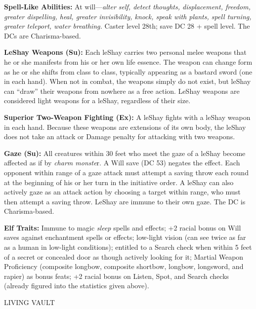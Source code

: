 \documentclass{article}
\begin{document}
{\textbf{Spell-Like Abilities: }At will---\textit{alter self, detect thoughts, displacement, 
freedom, greater dispelling, heal, greater invisibility, knock, speak with plants, 
spell turning, greater teleport, water breathing. }Caster level 28th; save DC 28 
+ spell level. The DCs are Charisma-based.

\textbf{LeShay Weapons (Su):} Each leShay carries two personal melee weapons that 
he or she manifests from his or her own life essence. The weapon can change form 
as he or she shifts from class to class, typically appearing as a bastard sword 
(one in each hand). When not in combat, the weapons simply do not exist, but leShay 
can ``draw'' their weapons from nowhere as a free action. LeShay weapons are considered 
light weapons for a leShay, regardless of their size. 

\textbf{Superior Two-Weapon Fighting (Ex):} A leShay fights with a leShay weapon 
in each hand. Because these weapons are extensions of its own body, the leShay 
does not take an attack or Damage penalty for attacking with two weapons. 

\textbf{Gaze (Su):} All creatures within 30 feet who meet the gaze of a leShay 
become affected as if by \textit{charm monste}r. A Will save (DC 53) negates the 
effect. Each opponent within range of a gaze attack must attempt a saving throw 
each round at the beginning of his or her turn in the initiative order. A leShay 
can also actively gaze as an attack action by choosing a target within range, who 
must then attempt a saving throw. LeShay are immune to their own gaze. The DC is 
Charisma-based.

\textbf{Elf Traits:} Immune to magic \textit{sleep }spells and effects; +2 racial 
bonus on Will saves against enchantment spells or effects; low-light vision (can 
see twice as far as a human in low-light conditions); entitled to a Search check 
when within 5 feet of a secret or concealed door as though actively looking for 
it; Martial Weapon Proficiency (composite longbow, composite shortbow, longbow, 
longsword, and rapier) as bonus feats; +2 racial bonus on Listen, Spot, and Search 
checks (already figured into the statistics given above). 

\vspace{12pt}
{\LARGE{}LIVING VAULT }

}
\end{document}
